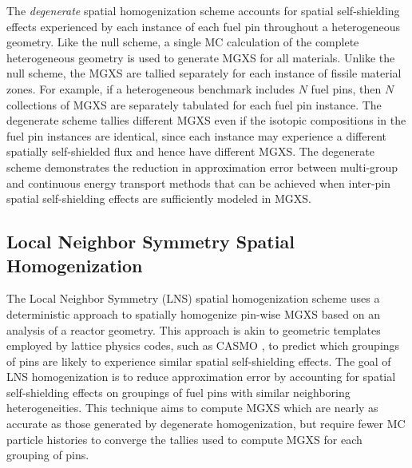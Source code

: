 The \textit{degenerate} spatial homogenization scheme accounts for spatial self-shielding effects experienced by each instance of each fuel pin throughout a heterogeneous geometry. Like the null scheme, a single MC calculation of the complete heterogeneous geometry is used to generate MGXS for all materials. Unlike the null scheme, the MGXS are tallied separately for each instance of fissile material zones. For example, if a heterogeneous benchmark includes $N$ fuel pins, then $N$ collections of MGXS are separately tabulated for each fuel pin instance. The degenerate scheme tallies different MGXS even if the isotopic compositions in the fuel pin instances are identical, since each instance may experience a different spatially self-shielded flux and hence have different MGXS. The degenerate scheme demonstrates the reduction in approximation error between multi-group and continuous energy transport methods that can be achieved when inter-pin spatial self-shielding effects are sufficiently modeled in MGXS.

\subsection{Local Neighbor Symmetry Spatial Homogenization}
\label{subsec:homogenize-lns}

The Local Neighbor Symmetry (LNS) spatial homogenization scheme uses a deterministic approach to spatially homogenize pin-wise MGXS based on an analysis of a reactor geometry. This approach is akin to geometric templates employed by lattice physics codes, such as CASMO \citep{edenius1995casmo}, to predict which groupings of pins are likely to experience similar spatial self-shielding effects. The goal of LNS homogenization is to reduce approximation error by accounting for spatial self-shielding effects on groupings of fuel pins with similar neighboring heterogeneities. This technique aims to compute MGXS which are nearly as accurate as those generated by degenerate homogenization, but require fewer MC particle histories to converge the tallies used to compute MGXS for each grouping of pins.



